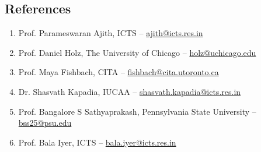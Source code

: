 \documentclass[11pt, margin, centered, letterpaper]{res}
\begin{document}
\begin{resume}
\section{References}
\begin{enumerate}[leftmargin=*]
 \item Prof. Parameswaran Ajith, ICTS -- \href{mailto:ajith@icts.res.in}{ajith@icts.res.in}
  \item Prof. Daniel Holz, The University of Chicago -- \href{mailto:holz@uchicago.edu}{holz@uchicago.edu}
  \item Prof. Maya Fishbach, CITA -- \href{mailto:fishbach@cita.utoronto.ca}{fishbach@cita.utoronto.ca}
 \item Dr. Shasvath Kapadia, IUCAA -- \href{mailto:shasvath.kapadia@iucaa.in}{shasvath.kapadia@icts.res.in}
 \item Prof. Bangalore S Sathyaprakash, Pennsylvania State University -- \href{mailto:bss25@psu.edu}{bss25@psu.edu}
 \item Prof. Bala Iyer, ICTS -- \href{mailto:bala.iyer@icts.res.in}{bala.iyer@icts.res.in}
\end{enumerate}

\end{resume}
\end{document}
